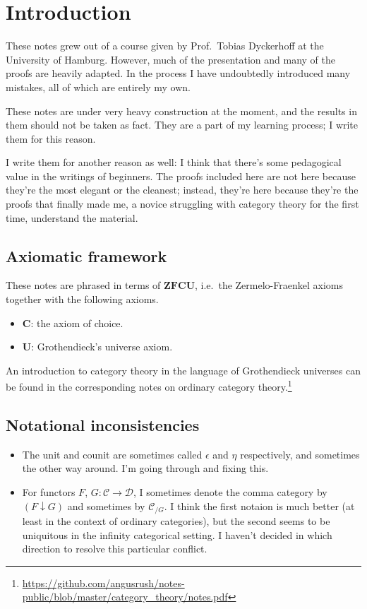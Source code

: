 \documentclass[main.tex]{subfiles}
\begin{document}
\chapter{Introduction}
\label{ch:introduction}

These notes grew out of a course given by Prof.\ Tobias Dyckerhoff at the University of Hamburg. However, much of the presentation and many of the proofs are heavily adapted. In the process I have undoubtedly introduced many mistakes, all of which are entirely my own.

These notes are under very heavy construction at the moment, and the results in them should not be taken as fact. They are a part of my learning process; I write them for this reason.

I write them for another reason as well: I think that there's some pedagogical value in the writings of beginners. The proofs included here are not here because they're the most elegant or the cleanest; instead, they're here because they're the proofs that finally made me, a novice struggling with category theory for the first time, understand the material.

\section{Axiomatic framework}
\label{sec:axiomatic_framework}

These notes are phrased in terms of $\mathbf{ZFCU}$, i.e.\ the Zermelo-Fraenkel axioms together with the following axioms.
\begin{itemize}
  \item $\mathbf{C}$: the axiom of choice.

  \item $\mathbf{U}$: Grothendieck's universe axiom.
\end{itemize}

An introduction to category theory in the language of Grothendieck universes can be found in the corresponding notes on ordinary category theory.\footnote{\url{https://github.com/angusrush/notes-public/blob/master/category_theory/notes.pdf}}

\section{Notational inconsistencies}
\label{sec:notation}

\begin{itemize}
  \item The unit and counit are sometimes called $\epsilon$ and $\eta$ respectively, and sometimes the other way around. I'm going through and fixing this.

  \item For functors $F$, $G\colon \mathcal{C} \to \mathcal{D}$, I sometimes denote the comma category by $(F \downarrow G)$ and sometimes by $\mathcal{C}_{/G}$. I think the first notaion is much better (at least in the context of ordinary categories), but the second seems to be uniquitous in the infinity categorical setting. I haven't decided in which direction to resolve this particular conflict.
\end{itemize}
\end{document}
